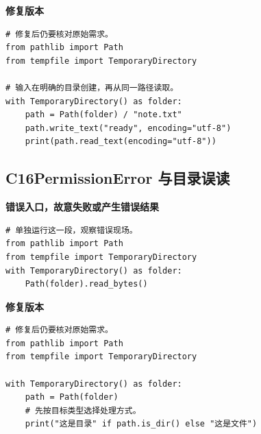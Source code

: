 \textbf{修复版本}

\begin{lstlisting}[title={\code{case_15.py}}]
# 修复后仍要核对原始需求。
from pathlib import Path
from tempfile import TemporaryDirectory

# 输入在明确的目录创建，再从同一路径读取。
with TemporaryDirectory() as folder:
    path = Path(folder) / "note.txt"
    path.write_text("ready", encoding="utf-8")
    print(path.read_text(encoding="utf-8"))
\end{lstlisting}


\subsection*{C16\enspace PermissionError 与目录误读}





\textbf{错误入口，故意失败或产生错误结果}

\begin{lstlisting}[style=errorcode,title={错误复现（故意失败或错误结果）：\code{case_16_bad.py.txt}}]
# 单独运行这一段，观察错误现场。
from pathlib import Path
from tempfile import TemporaryDirectory
with TemporaryDirectory() as folder:
    Path(folder).read_bytes()
\end{lstlisting}

\textbf{修复版本}

\begin{lstlisting}[title={\code{case_16.py}}]
# 修复后仍要核对原始需求。
from pathlib import Path
from tempfile import TemporaryDirectory

with TemporaryDirectory() as folder:
    path = Path(folder)
    # 先按目标类型选择处理方式。
    print("这是目录" if path.is_dir() else "这是文件")
\end{lstlisting}


